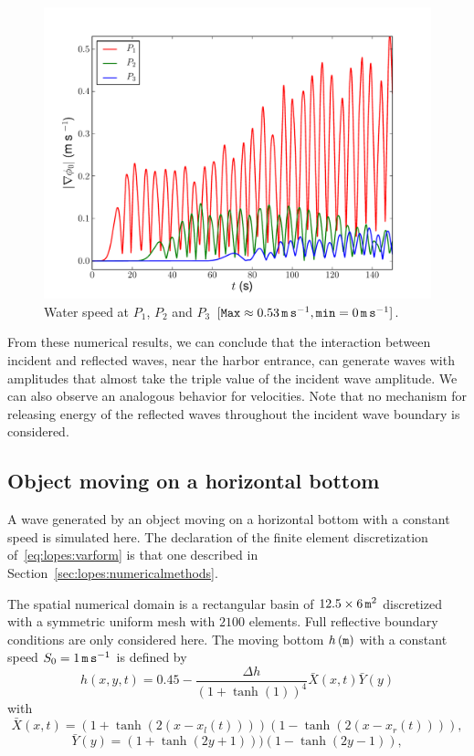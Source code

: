 \begin{figure}
  \centering
  \includegraphics[width=\largefig]{chapters/lopes/pdf/velprofile.pdf}
  \caption{Water speed at $P_1$, $P_2$ and $P_3$ $[{\tt Max}\approx
    0.53\, {\tt m\, s}^{-1}, {\tt min}=0\,{\tt m\, s}^{-1}]$.}
  \label{fig:lopes:velp}
\end{figure}

From these numerical results, we can conclude that the interaction
between incident and reflected waves, near the harbor entrance, can
generate waves with amplitudes that almost take the triple value of
the incident wave amplitude.  We can also observe an analogous
behavior for velocities.  Note that no mechanism for releasing energy
of the reflected waves throughout the incident wave boundary is
considered.

\subsection{Object moving on a horizontal bottom}

A wave generated by an object moving on a horizontal bottom with a
constant speed is simulated here.  The declaration of the finite
element discretization of~\eqref{eq:lopes:varform} is that one
described in Section~\ref{sec:lopes:numericalmethods}.

The spatial numerical domain is a rectangular basin of $12.5\times 6\,
{\tt m}^2$ discretized with a symmetric uniform mesh with $2100$
elements.  Full reflective boundary conditions are only considered
here.  The moving bottom $h\, ({\tt m})$ with a constant speed
$S_0=1\, {\tt m\, s}^{-1}$ is defined by
\begin{equation}
  \label{eq:lopes:bottom1}
  h(x,y,t)=0.45-\frac{\Delta h}{(1+\tanh(1))^4}{\bar
    X}(x,t){\bar Y}(y)
\end{equation}
with
\begin{equation}
  {\bar X}(x,t)=(1+\tanh(2(x-x_l(t))))(1-\tanh(2(x-x_r(t)))),
\end{equation}
\begin{equation}
  {\bar Y}(y)=(1+\tanh(2y+1)))(1-\tanh(2y-1)),
\end{equation}

